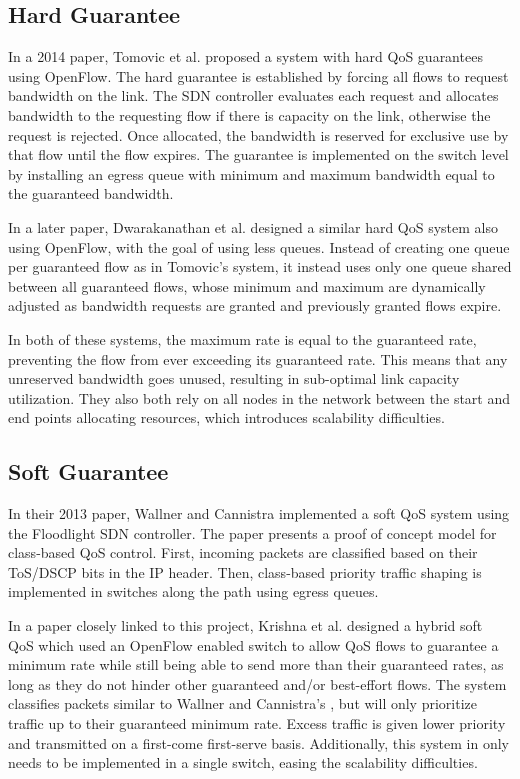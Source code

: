 \documentclass[accepted,single]{gipaper}
\begin{document}
\subsection{Hard Guarantee}
\label{prev_hard_qos}

In a 2014 paper, Tomovic et al. \cite{Tomovic:2014} proposed a system with hard QoS guarantees using OpenFlow. The hard guarantee is established by forcing all flows to request bandwidth on the link. The SDN controller evaluates each request and allocates bandwidth to the requesting flow if there is capacity on the link, otherwise the request is rejected. Once allocated, the bandwidth is reserved for exclusive use by that flow until the flow expires. The guarantee is implemented on the switch level by installing an egress queue with minimum and maximum bandwidth equal to the guaranteed bandwidth.

In a later paper, Dwarakanathan et al. \cite{Dwara:2015} designed a similar hard QoS system also using OpenFlow, with the goal of using less queues. Instead of creating one queue per guaranteed flow as in Tomovic's \cite{Tomovic:2014} system, it instead uses only one queue shared between all guaranteed flows, whose minimum and maximum are dynamically adjusted as bandwidth requests are granted and previously granted flows expire.

In both of these systems, the maximum rate is equal to the guaranteed rate, preventing the flow from ever exceeding its guaranteed rate. This means that any unreserved bandwidth goes unused, resulting in sub-optimal link capacity utilization. They also both rely on all nodes in the network between the start and end points allocating resources, which introduces scalability difficulties. 

\subsection{Soft Guarantee}
\label{prev_soft_qos}

In their 2013 paper, Wallner and Cannistra \cite{Wallner:2013} implemented a soft QoS system using the Floodlight SDN controller. The paper presents a proof of concept model for class-based QoS control. First, incoming packets are classified based on their ToS/DSCP bits in the IP header. Then, class-based priority traffic shaping is implemented in switches along the path using egress queues.

In a paper closely linked to this project, Krishna et al. \cite{Krishna:2016} designed a hybrid soft QoS which used an OpenFlow enabled switch to allow QoS flows to guarantee a minimum rate while still being able to send more than their guaranteed rates, as long as they do not hinder other guaranteed and/or best-effort flows. The system classifies packets similar to Wallner and Cannistra's \cite{Wallner:2013}, but will only prioritize traffic up to their guaranteed minimum rate. Excess traffic is given lower priority and transmitted on a first-come first-serve basis. Additionally, this system in only needs to be implemented in a single switch, easing the scalability difficulties.
\end{document}
